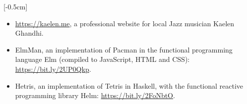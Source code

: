 \documentclass[9pt]{res} %
\begin{document}
\begin{resume}
[-0.5cm]
\begin{itemize} 
\item \url{https://kaelen.me}, a professional website for local Jazz musician Kaelen Ghandhi. 
\item ElmMan, an implementation of Pacman in the functional programming language Elm (compiled to JavaScript, HTML and CSS): \url{https://bit.ly/2UP0Qkp}.
\item Hetris, an implementation of Tetris in Haskell, with the functional reactive programming library Helm: \url{https://bit.ly/2FoNbtO}.

\end{itemize}
\end{resume}
\end{document}
